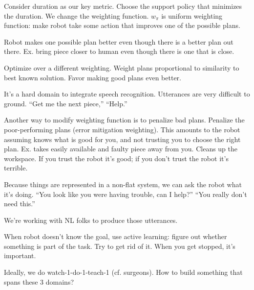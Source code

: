 Consider duration as our key metric.
Choose the support policy that minimizes the duration. We change the weighting function. %
$w_\pi$ is uniform weighting function: make robot take some action that improves one of the possible plans.



Robot makes one possible plan better even though there is a better plan out there. Ex. bring piece closer to human even though there is one that is close.

Optimize over a different weighting. Weight plans proportional to similarity to best known solution. Favor making good plans even better. 

It's a hard domain to integrate speech recognition. Utterances are very difficult to ground. ``Get me the next piece,'' ``Help.''

Another way to modify weighting function is to penalize bad plans. Penalize the poor-performing plans (error mitigation weighting). This amounts to the robot assuming knows what is good for you, and not trusting you to choose the right plan. Ex. takes easily available and faulty piece away from you.
Cleans up the workspace. If you trust the robot it's good; if you don't trust the robot it's terrible.


Because things are represented in a non-flat system, we can ask the robot what it's doing. ``You look like you were having trouble, can I help?'' ``You really don't need this.''

We're working with NL folks to produce those utterances.

When robot doesn't know the goal, use active learning: figure out whether something is part of the task. Try to get rid of it. When you get stopped, it's important.

Ideally, we do watch-1-do-1-teach-1 (cf. surgeons). How to build something that spans these 3 domains?